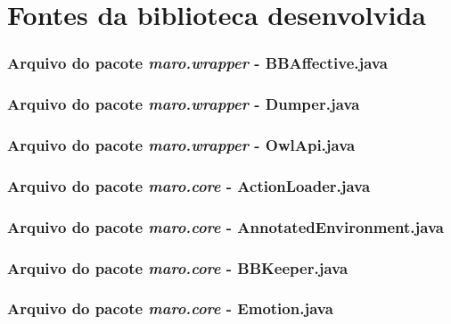 \chapter{Fontes da biblioteca desenvolvida}

\lstset{language=Java}
\lstset{linewidth=150mm}
\lstset{backgroundcolor=}
\lstset{breaklines=true}
\lstset{numbers=none}

\subsection*{Arquivo do pacote \emph{maro.wrapper} - BBAffective.java}


\subsection*{Arquivo do pacote \emph{maro.wrapper} - Dumper.java}


\subsection*{Arquivo do pacote \emph{maro.wrapper} - OwlApi.java}


\subsection*{ Arquivo do pacote \emph{maro.core} - ActionLoader.java}


\subsection*{ Arquivo do pacote \emph{maro.core} - AnnotatedEnvironment.java}


\subsection*{ Arquivo do pacote \emph{maro.core} - BBKeeper.java}


\subsection*{ Arquivo do pacote \emph{maro.core} - Emotion.java}


